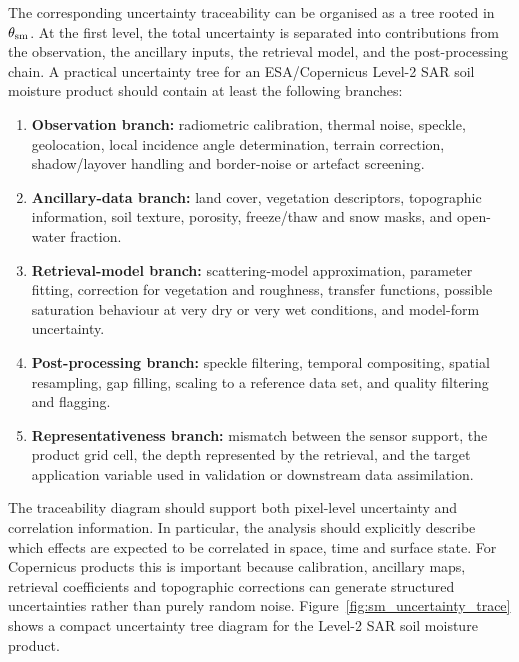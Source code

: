 The corresponding uncertainty traceability can be organised as a tree rooted in
$\theta_{\rm sm}$. At the first level, the total uncertainty is separated into
contributions from the observation, the ancillary inputs, the retrieval model,
and the post-processing chain. A practical uncertainty tree for an ESA/Copernicus
Level-2 \ac{SAR} soil moisture product should contain at least the following
branches:
\begin{enumerate}
  \item \textbf{Observation branch:} radiometric calibration, thermal noise,
  speckle, geolocation, local incidence angle determination, terrain correction,
  shadow/layover handling and border-noise or artefact screening.
  \item \textbf{Ancillary-data branch:} land cover, vegetation descriptors,
  topographic information, soil texture, porosity, freeze/thaw and snow masks,
  and open-water fraction.
  \item \textbf{Retrieval-model branch:} scattering-model approximation,
  parameter fitting, correction for vegetation and roughness, transfer
  functions, possible saturation behaviour at very dry or very wet conditions,
  and model-form uncertainty.
  \item \textbf{Post-processing branch:} speckle filtering, temporal
  compositing, spatial resampling, gap filling, scaling to a reference data set,
  and quality filtering and flagging.
  \item \textbf{Representativeness branch:} mismatch between the sensor support,
  the product grid cell, the depth represented by the retrieval, and the target
  application variable used in validation or downstream data assimilation.
\end{enumerate}

\noindent The traceability diagram should support both pixel-level uncertainty and
correlation information. In particular, the analysis should explicitly describe
which effects are expected to be correlated in space, time and surface state.
For Copernicus products this is important because calibration, ancillary maps,
retrieval coefficients and topographic corrections can generate structured
uncertainties rather than purely random noise. Figure~\ref{fig:sm_uncertainty_trace}
shows a compact uncertainty tree diagram for the Level-2 \ac{SAR} soil moisture
product.





